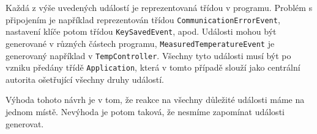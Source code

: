 Každá z výše uvedených událostí je reprezentovaná třídou v programu.
Problém s připojením je například reprezentován třídou \texttt{CommunicationErrorEvent}, nastavení
klíče potom třídou \texttt{KeySavedEvent}, apod.
Události mohou být generované v různých částech programu, \texttt{MeasuredTemperatureEvent} je generovaný
například v \texttt{TempController}.
Všechny tyto události musí být po vzniku předány třídě \texttt{Application}, která v tomto případě
slouží jako centrální autorita ošetřující všechny druhy událostí.

Výhoda tohoto návrh je v tom, že reakce na všechny důležité události máme na jednom místě.
Nevýhoda je potom taková, že nesmíme zapomínat události generovat.
